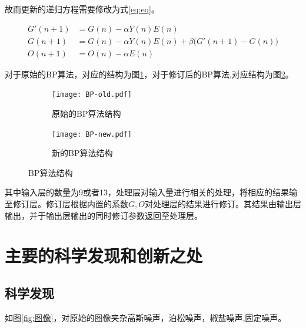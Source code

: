 \documentclass{article}
\newcounter{sub}
\begin{document}
故而更新的递归方程需要修改为式\ref{eq:eq}。

\begin{align}
	G'(n+1) & =G(n)-\alpha Y(n)E(n)\\
	G(n+1)  & =G(n)-\alpha Y(n)E(n)+\beta \big(G'(n+1)-G(n)\big)\\
	O(n+1)  & =O(n)-\alpha E(n)
	\label{eq:eq}
\end{align}

对于原始的BP算法，对应的结构为图\ref{fig:原始的BP算法结构}，对于修订后的BP算法,对应结构为图\ref{fig:新的BP算法结构}。

\begin{figure}[htpb]
	\centering
	\begin{subfigure}[htpb]{.45\linewidth}
		\centering
		\texttt{[image: BP-old.pdf]}
		\caption{原始的BP算法结构}
		\label{fig:原始的BP算法结构}
	\end{subfigure}
	\quad
	\begin{subfigure}[htpb]{.45\linewidth}
		\centering
		\texttt{[image: BP-new.pdf]}
		\caption{新的BP算法结构}
		\label{fig:新的BP算法结构}
	\end{subfigure}
	\caption{BP算法结构}
	\label{fig:BP算法结构}
\end{figure}

其中输入层的数量为9或者13，处理层对输入量进行相关的处理，将相应的结果输至修订层。修订层根据内置的系数$ G,O $对处理层的结果进行修订。其结果由输出层输出，并于输出层输出的同时修订参数返回至处理层。

\newpage

\section{主要的科学发现和创新之处}%
\label{sec:主要的科学发现和创新之处}

\subsection{科学发现}%
\label{sub:科学发现}

如图\ref{fig:图像}，对原始的图像夹杂高斯噪声，泊松噪声，椒盐噪声,固定噪声。
\end{document}
